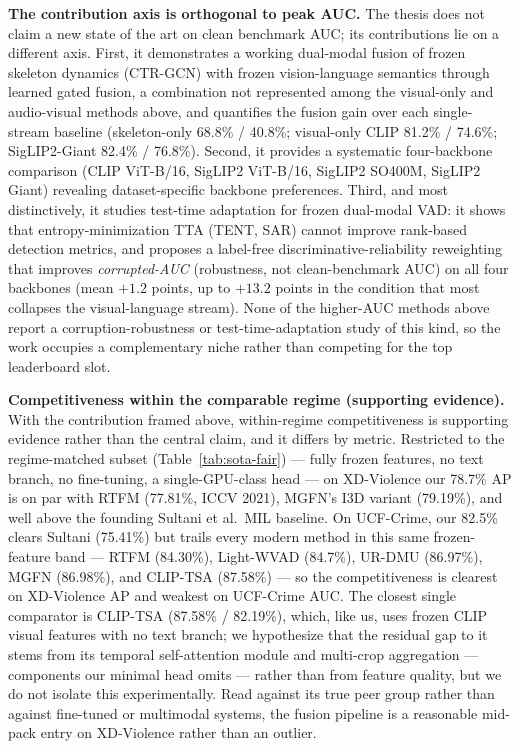 \medskip\noindent\textbf{The contribution axis is orthogonal to peak AUC.}
The thesis does not claim a new state of the art on clean benchmark AUC; its
contributions lie on a different axis. First, it demonstrates a working
dual-modal fusion of frozen skeleton dynamics (CTR-GCN) with frozen
vision-language semantics through learned gated fusion, a combination not
represented among the visual-only and audio-visual methods above, and quantifies
the fusion gain over each single-stream baseline (skeleton-only 68.8\% / 40.8\%;
visual-only CLIP 81.2\% / 74.6\%; SigLIP2-Giant 82.4\% / 76.8\%). Second, it
provides a systematic four-backbone comparison (CLIP ViT-B/16, SigLIP2 ViT-B/16,
SigLIP2 SO400M, SigLIP2 Giant) revealing dataset-specific backbone preferences.
Third, and most distinctively, it studies test-time adaptation for frozen
dual-modal VAD: it shows that entropy-minimization TTA (TENT, SAR) cannot
improve rank-based detection metrics, and proposes a label-free
discriminative-reliability reweighting that improves \emph{corrupted-AUC}
(robustness, not clean-benchmark AUC) on all four backbones (mean $+1.2$ points, up
to $+13.2$ points in the condition that most collapses the visual-language
stream). None of the higher-AUC methods above
report a corruption-robustness or test-time-adaptation study of this kind, so
the work occupies a complementary niche rather than competing for the top
leaderboard slot.

\medskip\noindent\textbf{Competitiveness within the comparable regime (supporting evidence).}
With the contribution framed above, within-regime competitiveness is supporting
evidence rather than the central claim, and it differs by metric. Restricted to
the regime-matched subset (Table~\ref{tab:sota-fair}) --- fully frozen
features, no text branch, no fine-tuning, a single-GPU-class head --- on
XD-Violence our 78.7\% AP is on par with RTFM (77.81\%, ICCV 2021), MGFN's I3D
variant (79.19\%), and well above
the founding Sultani et al.\ MIL baseline. On UCF-Crime, our 82.5\% clears
Sultani (75.41\%) but trails every modern method in this same frozen-feature
band --- RTFM (84.30\%), Light-WVAD (84.7\%), UR-DMU (86.97\%), MGFN (86.98\%),
and CLIP-TSA (87.58\%) --- so the competitiveness is clearest on XD-Violence AP
and weakest on UCF-Crime AUC. The closest single comparator is CLIP-TSA
(87.58\% / 82.19\%), which, like us, uses frozen CLIP visual features with no
text branch; we hypothesize that the residual gap to it stems from its temporal
self-attention module and multi-crop aggregation --- components our minimal head
omits --- rather than from feature quality, but we do not isolate this
experimentally. Read against its true peer group rather than against fine-tuned
or multimodal systems, the fusion pipeline is a reasonable mid-pack entry on
XD-Violence rather than an outlier.

